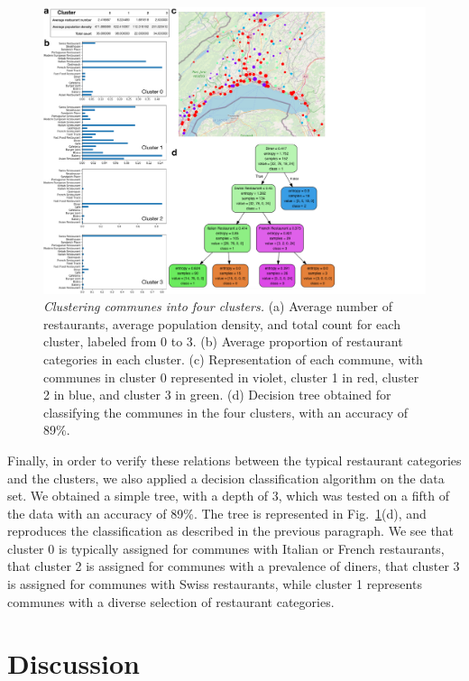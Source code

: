 \documentclass[12pt]{article}
\begin{document}
\begin{figure}
\begin{center}
\includegraphics[width=\textwidth]{Figures/Fig10}
\caption{\label{fig10} \emph{Clustering communes into four clusters.} (a) Average number of restaurants, average population density, and total count for each cluster, labeled from 0 to 3. (b) Average proportion of restaurant categories in each cluster. (c) Representation of each commune, with communes in cluster 0 represented in violet, cluster 1 in red, cluster 2 in blue, and cluster 3 in green. (d) Decision tree obtained for classifying the communes in the four clusters, with an accuracy of 89\%.}
\end{center}
\end{figure}


Finally, in order to verify these relations between the typical restaurant categories and the clusters, we also applied a decision classification algorithm on the data set. We obtained a simple tree, with a depth of 3, which was tested on a fifth of the data with an accuracy of 89\%. The tree is represented in Fig.~\ref{fig10}(d), and reproduces the classification as described in the previous paragraph. We see that cluster 0 is typically assigned for communes with Italian or French restaurants, that cluster 2 is assigned for communes with a prevalence of diners, that cluster 3 is assigned for communes with Swiss restaurants, while cluster 1 represents communes with a diverse selection of restaurant categories. 

\section{Discussion}
\end{document}
